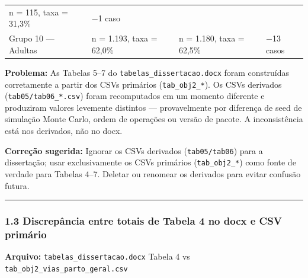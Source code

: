 \documentclass[
]{article}
\begin{document}
\begin{longtable}[]{@{}llll@{}}
\begin{minipage}[t]{0.22\columnwidth}
n = 115, taxa = 31,3\%\strut
\end{minipage} & \begin{minipage}[t]{0.22\columnwidth}\raggedright
−1 caso\strut
\end{minipage}\tabularnewline
\begin{minipage}[t]{0.22\columnwidth}\raggedright
Grupo 10 --- Adultas\strut
\end{minipage} & \begin{minipage}[t]{0.22\columnwidth}\raggedright
n = 1.193, taxa = 62,0\%\strut
\end{minipage} & \begin{minipage}[t]{0.22\columnwidth}\raggedright
n = 1.180, taxa = 62,5\%\strut
\end{minipage} & \begin{minipage}[t]{0.22\columnwidth}\raggedright
−13 casos\strut
\end{minipage}\tabularnewline
\bottomrule
\end{longtable}

\textbf{Problema:} As Tabelas 5--7 do \texttt{tabelas\_dissertacao.docx}
foram construídas corretamente a partir dos CSVs primários
(\texttt{tab\_obj2\_*}). Os CSVs derivados (\texttt{tab05/tab06\_*.csv})
foram recomputados em um momento diferente e produziram valores
levemente distintos --- provavelmente por diferença de seed de simulação
Monte Carlo, ordem de operações ou versão de pacote. A inconsistência
está nos derivados, não no docx.

\textbf{Correção sugerida:} Ignorar os CSVs derivados
(\texttt{tab05/tab06}) para a dissertação; usar exclusivamente os CSVs
primários (\texttt{tab\_obj2\_*}) como fonte de verdade para Tabelas
4--7. Deletar ou renomear os derivados para evitar confusão futura.

\begin{center}\rule{0.5\linewidth}{0.5pt}\end{center}

\hypertarget{discrepuxe2ncia-entre-totais-de-tabela-4-no-docx-e-csv-primuxe1rio}{%
\subsubsection{1.3 Discrepância entre totais de Tabela 4 no docx e CSV
primário}\label{discrepuxe2ncia-entre-totais-de-tabela-4-no-docx-e-csv-primuxe1rio}}

\textbf{Arquivo:} \texttt{tabelas\_dissertacao.docx} Tabela 4 vs
\texttt{tab\_obj2\_vias\_parto\_geral.csv}
\end{document}

